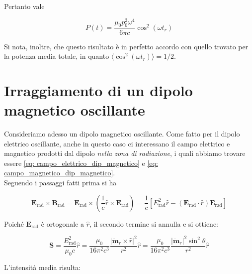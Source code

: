 Pertanto vale 

\begin{tcolorbox}[colback=yellow!10!white, colframe=orange!70!black, boxrule=0.8pt]
\begin{equation}
    P(t) = \frac{\mu_0 p_0^2 \omega^4}{6 \pi c} \cos^2 (\omega t_r)
\end{equation}
\end{tcolorbox}

Si nota, inoltre, che questo risultato è in perfetto accordo con quello trovato per la potenza media totale, in quanto $\langle \cos^2(\omega t_r)\rangle = 1/2$.

\section{Irraggiamento di un dipolo magnetico oscillante}

Consideriamo adesso un dipolo magnetico oscillante. Come fatto per il dipolo elettrico oscillante, anche in questo caso ci interessano il campo elettrico e magnetico prodotti dal dipolo \emph{nella zona di radiazione}, i quali abbiamo trovare essere \eqref{eq: campo_elettrico_dip_magnetico} e \eqref{eq: campo_magnetico_dip_magnetico}. \\
Seguendo i passaggi fatti prima si ha

\begin{equation}
    \mathbf{E}_{\text{rad}} \times \mathbf{B}_{\text{rad}} = \mathbf{E}_{\text{rad}} \times \left( \frac{1}{c} \hat{r} \times \mathbf{E}_{\text{rad}} \right) = \frac{1}{c} [E_{\text{rad}}^2 \hat{r} - (\mathbf{E}_{\text{rad}} \cdot \hat{r})\mathbf{E}_{\text{rad}}]
\end{equation}

Poiché $\mathbf{E}_{\text{rad}}$ è ortogonale a $\hat{r}$, il secondo termine si annulla e si ottiene:

\begin{tcolorbox}[colback=yellow!10!white, colframe=orange!70!black, boxrule=0.8pt]
\begin{equation}
    \mathbf{S} = \frac{E_{\text{rad}}^2}{\mu_0 c} \hat{r} = \frac{\mu_0}{16\pi^2 c^3} \frac{|\ddot{\mathbf{m}}_r \times \hat{r}|^2}{r^2} \hat{r} = \frac{\mu_0}{16\pi^2 c^3} \frac{|\ddot{\mathbf{m}}_r|^2 \sin^2\theta}{r^2} \hat{r}
\end{equation}
\end{tcolorbox}

\newpage

L'intensità media risulta:

